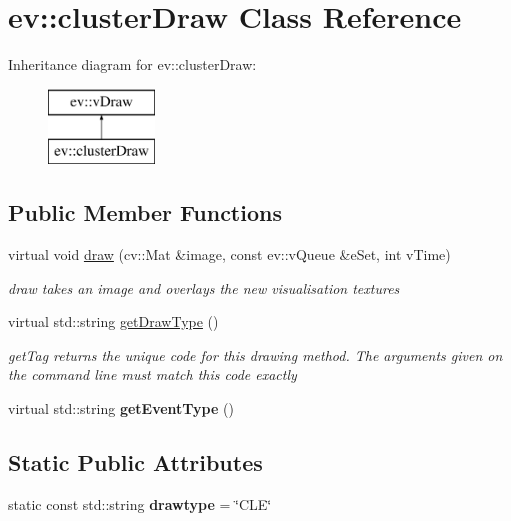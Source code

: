 \hypertarget{classev_1_1clusterDraw}{}\section{ev\+:\+:cluster\+Draw Class Reference}
\label{classev_1_1clusterDraw}
Inheritance diagram for ev\+:\+:cluster\+Draw\+:\begin{figure}[H]
\begin{center}
\leavevmode
\includegraphics[height=2.000000cm]{classev_1_1clusterDraw}
\end{center}
\end{figure}
\subsection*{Public Member Functions}
\begin{DoxyCompactItemize}
\item 
virtual void \hyperlink{classev_1_1clusterDraw_aa70978bb98c7bde912eb03288f21cbb5}{draw} (cv\+::\+Mat \&image, const ev\+::v\+Queue \&e\+Set, int v\+Time)
\begin{DoxyCompactList}\small\item\em draw takes an image and overlays the new visualisation textures \end{DoxyCompactList}\item 
virtual std\+::string \hyperlink{classev_1_1clusterDraw_a21cd4ba2277ad5258b39d135e445b32f}{get\+Draw\+Type} ()
\begin{DoxyCompactList}\small\item\em get\+Tag returns the unique code for this drawing method. The arguments given on the command line must match this code exactly \end{DoxyCompactList}\item 
\mbox{\label{classev_1_1clusterDraw_acfac944ed03a27cb408629fa2e9e44b7}} 
virtual std\+::string {\bfseries get\+Event\+Type} ()
\end{DoxyCompactItemize}
\subsection*{Static Public Attributes}
\begin{DoxyCompactItemize}
\item 
\mbox{\label{classev_1_1clusterDraw_ad498fb53993170b82b0116a43a3afd57}} 
static const std\+::string {\bfseries drawtype} = \char`\"{}C\+LE\char`\"{}
\end{DoxyCompactItemize}
